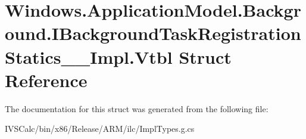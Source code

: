 \hypertarget{struct_windows_1_1_application_model_1_1_background_1_1_i_background_task_registration_statics_____impl_1_1_vtbl}{}\section{Windows.\+Application\+Model.\+Background.\+I\+Background\+Task\+Registration\+Statics\+\_\+\+\_\+\+Impl.\+Vtbl Struct Reference}
\label{struct_windows_1_1_application_model_1_1_background_1_1_i_background_task_registration_statics_____impl_1_1_vtbl}


The documentation for this struct was generated from the following file\+:\begin{DoxyCompactItemize}
\item 
I\+V\+S\+Calc/bin/x86/\+Release/\+A\+R\+M/ilc/Impl\+Types.\+g.\+cs\end{DoxyCompactItemize}
